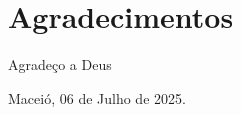 \chapter*{Agradecimentos}


Agradeço a Deus

\vspace{15mm}

\begin{minipage}{.45\linewidth}
\begin{flushleft}
Maceió, 06 de Julho de 2025.
\end{flushleft}
\end{minipage}
\begin{minipage}{.45\linewidth}
\end{minipage}